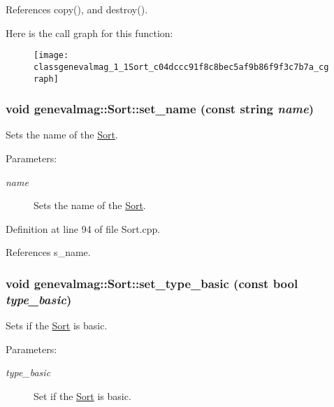 References copy(), and destroy().

Here is the call graph for this function:\nopagebreak
\begin{figure}[H]
\begin{center}
\leavevmode
\texttt{[image: classgenevalmag\_1\_1Sort\_c04dccc91f8c8bec5af9b86f9f3c7b7a\_cgraph]}
\end{center}
\end{figure}
\hypertarget{classgenevalmag_1_1Sort_b98ad164260650cae11a6a712d1808d5}{
\subsubsection[{set\_\-name}]{\setlength{\rightskip}{0pt plus 5cm}void genevalmag::Sort::set\_\-name (const string {\em name})}}
\label{classgenevalmag_1_1Sort_b98ad164260650cae11a6a712d1808d5}


Sets the name of the \hyperlink{classgenevalmag_1_1Sort}{Sort}. \begin{Desc}
\item[Parameters:]
\begin{description}
\item[{\em name}]Sets the name of the \hyperlink{classgenevalmag_1_1Sort}{Sort}. \end{description}
\end{Desc}


Definition at line 94 of file Sort.cpp.

References s\_\-name.\hypertarget{classgenevalmag_1_1Sort_ef4090cc2961e5f9614d1db43386d485}{
\subsubsection[{set\_\-type\_\-basic}]{\setlength{\rightskip}{0pt plus 5cm}void genevalmag::Sort::set\_\-type\_\-basic (const bool {\em type\_\-basic})}}
\label{classgenevalmag_1_1Sort_ef4090cc2961e5f9614d1db43386d485}


Sets if the \hyperlink{classgenevalmag_1_1Sort}{Sort} is basic. \begin{Desc}
\item[Parameters:]
\begin{description}
\item[{\em type\_\-basic}]Set if the \hyperlink{classgenevalmag_1_1Sort}{Sort} is basic. \end{description}
\end{Desc}


